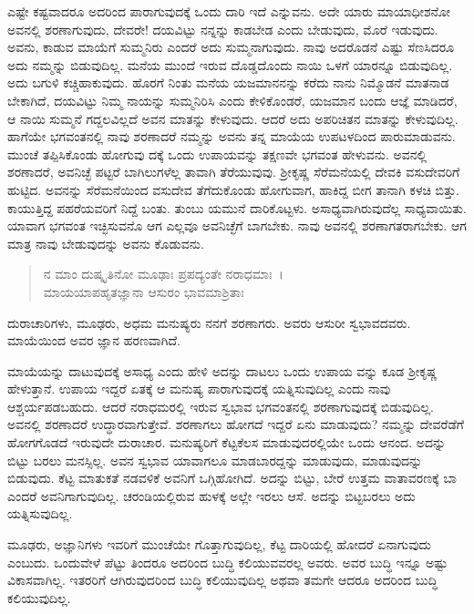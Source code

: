 ಎಷ್ಟೇ ಕಷ್ಟವಾದರೂ ಅದರಿಂದ ಪಾರಾಗುವುದಕ್ಕೆ ಒಂದು ದಾರಿ ಇದೆ ಎನ್ನುವನು. ಅದೇ ಯಾರು ಮಾಯಾಧೀಶನೋ ಅವನಲ್ಲಿ ಶರಣಾಗುವುದು, ದೇವರೇ! ದಯವಿಟ್ಟು ನನ್ನನ್ನು ಕಾಡಬೇಡ ಎಂದು ಬೇಡುವುದು, ಮೊರೆ ಇಡುವುದು. ಅವನು, ಕಾಡುವ ಮಾಯೆಗೆ ಸುಮ್ಮನಿರು ಎಂದರೆ ಅದು ಸುಮ್ಮನಾಗುವುದು. ನಾವು ಅದರೊಡನೆ ಎಷ್ಟು ಸೆಣಸಿದರೂ ಅದು ನಮ್ಮನ್ನು ಬಿಡುವುದಿಲ್ಲ. ಮನೆಯ ಮುಂದೆ ಇರುವ ದೊಡ್ಡದೊಂದು ನಾಯಿ ಒಳಗೆ ಯಾರನ್ನೂ ಬಿಡುವುದಿಲ್ಲ. ಅದು ಬಗುಳಿ ಕಚ್ಚಿಹಾಕುವುದು. ಹೊರಗೆ ನಿಂತು ಮನೆಯ ಯಜಮಾನನನ್ನು ಕರೆದು ನಾನು ನಿಮ್ಮೊಡನೆ ಮಾತನಾಡ ಬೇಕಾಗಿದೆ, ದಯವಿಟ್ಟು ನಿಮ್ಮ ನಾಯನ್ನು ಸುಮ್ಮನಿರಿಸಿ ಎಂದು ಕೇಳಿಕೊಂಡರೆ, ಯಜಮಾನ ಬಂದು ಆಜ್ಞೆ ಮಾಡಿದರೆ, ಆ ನಾಯಿ ಸುಮ್ಮನೆ ಗದ್ದಲವಿಲ್ಲದೆ ಅವನ ಮಾತನ್ನು ಕೇಳುವುದು. ಆದರೆ ಅದು ಅಪರಿಚಿತನ ಮಾತನ್ನು ಕೇಳುವುದಿಲ್ಲ. ಹಾಗೆಯೇ ಭಗವಂತನಲ್ಲಿ ನಾವು ಶರಣಾದರೆ ನಮ್ಮನ್ನು ಅವನು ತನ್ನ ಮಾಯೆಯ ಉಪಟಳದಿಂದ ಪಾರುಮಾಡುವನು. ಮುಂಚೆ ತಪ್ಪಿಸಿಕೊಂಡು ಹೋಗುವು ದಕ್ಕೆ ಒಂದು ಉಪಾಯವನ್ನು ತಕ್ಷಣವೇ ಭಗವಂತ ಹೇಳುವನು. ಅವನಲ್ಲಿ ಶರಣಾದರೆ, ಅವನಿಚ್ಛೆ ಪಟ್ಟರೆ ಬಾಗಿಲುಗಳೆಲ್ಲ ತಾವಾಗಿ ತೆರೆಯುವುವು. ಶ‍್ರೀಕೃಷ್ಣ ಸೆರೆಮನೆಯಲ್ಲಿ ದೇವಕಿ ವಸುದೇವರಿಗೆ ಹುಟ್ಟಿದ. ಅವನನ್ನು ಸೆರೆಮನೆಯಿಂದ ವಸುದೇವ ತೆಗೆದುಕೊಂಡು ಹೋಗುವಾಗ, ಹಾಕಿದ್ದ ಬೀಗ ತಾನಾಗಿ ಕಳಚಿ ಬಿತ್ತು. ಕಾಯುತ್ತಿದ್ದ ಪಹರೆಯವರಿಗೆ ನಿದ್ದೆ ಬಂತು. ತುಂಬು ಯಮುನೆ ದಾರಿಕೊಟ್ಟಳು. ಅಸಾಧ್ಯವಾಗಿರುವುದೆಲ್ಲ ಸಾಧ್ಯವಾಯಿತು. ಯಾವಾಗ ಭಗವಂತ ಇಚ್ಛಿಸುವನೊ ಆಗ ಎಲ್ಲವೂ ಅವನಿಚ್ಛೆಗೆ ಬಾಗಬೇಕು. ನಾವು ಅವನಲ್ಲಿ ಶರಣಾಗತರಾಗಬೇಕು. ಆಗ ಮಾತ್ರ ನಾವು ಬೇಡುವುದನ್ನು ಅವನು ಕೊಡುವನು.

\begin{verse}
ನ ಮಾಂ ದುಷ್ಕೃತಿನೋ ಮೂಢಾಃ ಪ್ರಪದ್ಯಂತೇ ನರಾಧಮಾಃ~।\\ಮಾಯಯಾಪಹೃತಜ್ಞಾನಾ ಆಸುರಂ ಭಾವಮಾಶ್ರಿತಾಃ 
\end{verse}

{\small ದುರಾಚಾರಿಗಳು, ಮೂಢರು, ಅಧಮ ಮನುಷ್ಯರು ನನಗೆ ಶರಣಾಗರು. ಅವರು ಆಸುರೀ ಸ್ವಭಾವದವರು. ಮಾಯೆಯಿಂದ ಅವರ ಜ್ಞಾನ ಹರಣವಾಗಿದೆ. }

ಮಾಯೆಯನ್ನು ದಾಟುವುದಕ್ಕೆ ಅಸಾಧ್ಯ ಎಂದು ಹೇಳಿ ಅದನ್ನು ದಾಟಲು ಒಂದು ಉಪಾಯ ವನ್ನು ಕೂಡ ಶ‍್ರೀಕೃಷ್ಣ ಹೇಳುತ್ತಾನೆ. ಉಪಾಯ ಇದ್ದರೆ ಏತಕ್ಕೆ ಆ ಮನುಷ್ಯ ಪಾರಾಗುವುದಕ್ಕೆ ಯತ್ನಿಸುವುದಿಲ್ಲ ಎಂದು ನಾವು ಆಶ್ಚರ್ಯಪಡಬಹುದು. ಆದರೆ ನರಾಧಮರಲ್ಲಿ ಇರುವ ಸ್ವಭಾವ ಭಗವಂತನಲ್ಲಿ ಶರಣಾಗುವುದಕ್ಕೆ ಬಿಡುವುದಿಲ್ಲ. ಅವನಲ್ಲಿ ಶರಣಾದರೆ ಉದ್ಧಾರವಾಗುತ್ತೇವೆ. ಶರಣಾಗಲು ಹೋಗದೆ ಇದ್ದರೆ ಏನು ಮಾಡುವುದು? ನಮ್ಮನ್ನು ದೇವರೆಡೆಗೆ ಹೋಗಗೊಡದೆ ಇರುವುದೇ ದುರಾಚಾರ. ಮನುಷ್ಯರಿಗೆ ಕೆಟ್ಟಕೆಲಸ ಮಾಡುವುದರಲ್ಲಿಯೇ ಒಂದು ಆನಂದ. ಅದನ್ನು ಬಿಟ್ಟು ಬರಲು ಮನಸ್ಸಿಲ್ಲ. ಅವನ ಸ್ವಭಾವ ಯಾವಾಗಲೂ ಮಾಡಬಾರದ್ದನ್ನು ಮಾಡುವುದು, ಮಾಡುವುದನ್ನು ಬಿಡುವುದು. ಕೆಟ್ಟ ಮಾತುಕತೆ ನಡವಳಿಕೆ ಅವನಿಗೆ ಒಗ್ಗಿಹೋಗಿದೆ. ಅದನ್ನು ಬಿಟ್ಟು, ಬೇರೆ ಉತ್ತಮ ವಾತಾವರಣಕ್ಕೆ ಬಾ ಎಂದರೆ ಅವನಿಗಾಗುವುದಿಲ್ಲ. ಚರಂಡಿಯಲ್ಲಿರುವ ಹುಳಕ್ಕೆ ಅಲ್ಲೇ ಇರಲು ಆಸೆ. ಅದನ್ನು ಬಿಟ್ಟಬರಲು ಅದು ಯತ್ನಿಸುವುದಿಲ್ಲ. 

ಮೂಢರು, ಅಜ್ಞಾನಿಗಳು ಇವರಿಗೆ ಮುಂಚೆಯೇ ಗೊತ್ತಾಗುವುದಿಲ್ಲ, ಕೆಟ್ಟ ದಾರಿಯಲ್ಲಿ ಹೋದರೆ ಏನಾಗುವುದು ಎಂಬುದು. ಒಂದುವೇಳೆ ಪೆಟ್ಟು ತಿಂದರೂ ಅದರಿಂದ ಬುದ್ಧಿ ಕಲಿಯುವವರಲ್ಲ ಅವರು. ಅವರ ಬುದ್ಧಿ ಇನ್ನೂ ಅಷ್ಟು ವಿಕಾಸವಾಗಿಲ್ಲ. ಇತರರಿಗೆ ಆಗಿರುವುದರಿಂದ ಬುದ್ಧಿ ಕಲಿಯುವುದಿಲ್ಲ ಅಥವಾ ತಮಗೇ ಆದರೂ ಅದರಿಂದ ಬುದ್ಧಿ ಕಲಿಯುವುದಿಲ್ಲ.

